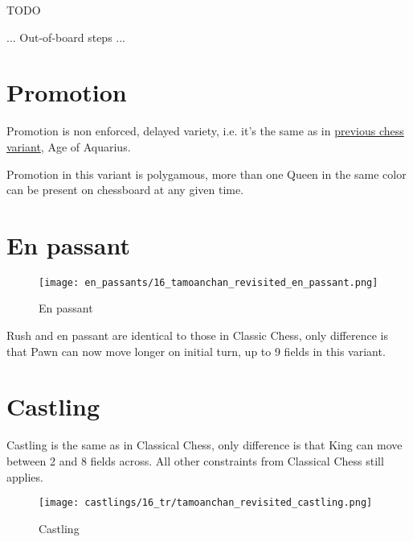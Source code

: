 \huge{TODO}
\normalsize{}

... Out-of-board steps ...

\clearpage %

\section*{Promotion}

Promotion is non enforced, delayed variety, i.e. it's the same as in
\hyperref[sec:Age of Aquarius/Promotion]{previous chess variant}, Age of Aquarius.

Promotion in this variant is polygamous, more than one Queen in the same color
can be present on chessboard at any given time.

\clearpage %

\section*{En passant}

\noindent
\begin{wrapfigure}{l}{0.4\textwidth}
\centering
\texttt{[image: en\_passants/16\_tamoanchan\_revisited\_en\_passant.png]}
\caption{En passant}
\label{fig:16_tamoanchan_revisited_en_passant}
\end{wrapfigure}
Rush and en passant are identical to those in Classic Chess, only difference
is that Pawn can now move longer on initial turn, up to 9 fields in this
variant.

\clearpage %

\section*{Castling}

Castling is the same as in Classical Chess, only difference is that King can move between 2 and 8 fields across.
All other constraints from Classical Chess still applies.

\noindent
\begin{figure}[!h]
\texttt{[image: castlings/16\_tr/tamoanchan\_revisited\_castling.png]}
\caption{Castling}
\label{fig:tamoanchan_revisited_castling}
\end{figure}

